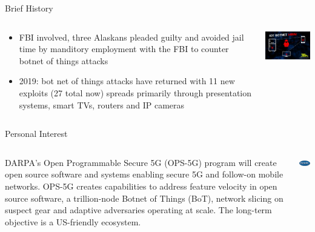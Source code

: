 \documentclass[pdf]{beamer}
\begin{document}
\begin{frame}[fragile]{Brief History}
\begin{minipage}[0.2\textheight]{\textwidth}
\begin{columns}[T]
\begin{column}{0.5\textwidth}
\begin{itemize}
\item FBI involved, three Alaskans pleaded guilty and avoided jail time by manditory employment with the FBI to counter botnet of things attacks
\item 2019: bot net of things attacks have returned with 11 new exploits (27 total now) spreads primarily through presentation systems, smart TVs, routers and IP cameras
\end{itemize}
\end{column}
\begin{column}{0.5\textwidth}
\vspace{1cm}
\includegraphics[width=5cm]{Images/mirai.jpg}
\end{column}
\end{columns}
\end{minipage}
\end{frame}


\begin{frame}[fragile]{Personal Interest}
\begin{minipage}[0.2\textheight]{\textwidth}
\begin{columns}[T]
\begin{column}{0.75\textwidth}
DARPA’s Open Programmable Secure 5G (OPS-5G) program will create open source software and systems enabling secure 5G and follow-on mobile networks. OPS-5G creates capabilities to address feature velocity in open source software, a trillion-node Botnet of Things (BoT), network slicing on suspect gear and adaptive adversaries operating at scale. The long-term objective is a US-friendly ecosystem.
\end{column}
\begin{column}{0.25\textwidth}
\vspace{1cm}
\includegraphics[width=2.5cm]{Images/darpa.jpg}
\end{column}
\end{columns}
\end{minipage}
\end{frame}
\end{document}
